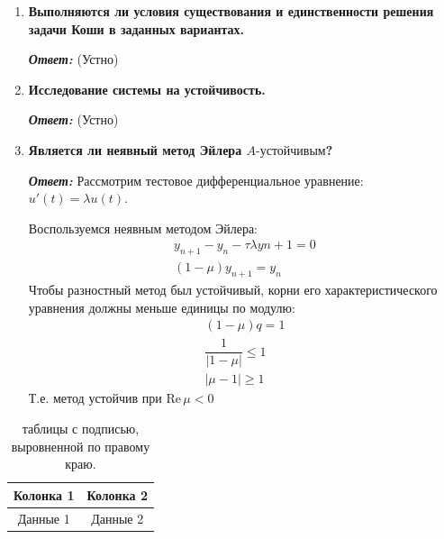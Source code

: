 \documentclass[12pt, a4paper]{article}
\begin{document}
\begin{enumerate}
		\item \textbf{Выполняются ли условия существования и единственности решения задачи Коши в заданных вариантах.}
		\vspace*{0.2cm} 
		
		\textit{\textbf{Ответ:}} 
		(Устно)
		
		\item \textbf{Исследование системы на устойчивость.}
		\vspace*{0.2cm} 
		
		\textit{\textbf{Ответ:}} 
		(Устно)
	
		
		\item \textbf{Является ли неявный метод Эйлера $A\text{-устойчивым}$?}
		\vspace*{0.2cm} 
		
		\textit{\textbf{Ответ:}} 
		Рассмотрим тестовое дифференциальное уравнение: $u'(t) = \lambda u(t)$.
		
		Воспользуемся неявным методом Эйлера:
		\begin{gather*}
		y_{n+1} - y_{n} - \tau \lambda y{n+1} = 0 \\
		(1-\mu) y_{n+1}  = y_{n}
		\end{gather*}
		Чтобы разностный метод был устойчивый, корни его характеристического уравнения должны меньше единицы по модулю:
		\begin{gather*}
			(1-\mu) q  = 1 \\
			\dfrac{1}{|1-\mu|} \le 1 \\
			|\mu - 1| \ge 1
		\end{gather*}
		Т.е. метод устойчив при $\text{Re} \, \mu < 0$
	\end{enumerate}
	\begin{table}[ht]
		\centering
		\begin{tabular}{|c|c|}
			\hline
			Колонка 1 & Колонка 2 \\
			\hline
			Данные 1 & Данные 2 \\
			\hline
		\end{tabular}
		\caption{ таблицы с подписью, выровненной по правому краю.}
		\label{tab:example}
	\end{table}
	
	
\end{document}
